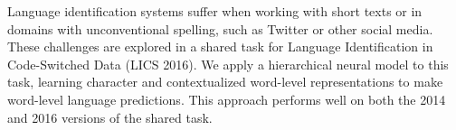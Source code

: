Language identification systems suffer when working with short texts or in domains with unconventional spelling, such as Twitter or other social media. These challenges are explored in a shared task for Language Identification in Code-Switched Data (LICS 2016). We apply a hierarchical neural model to this task, learning character and contextualized word-level representations to make word-level language predictions. This approach performs well on both the 2014 and 2016 versions of the shared task.
